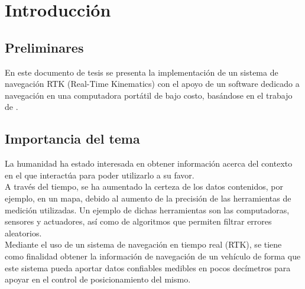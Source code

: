 
\chapter{Introducción} %

\label{Chap:Intro} %


\newcommand{\keyword}[1]{\textbf{#1}}
\newcommand{\tabhead}[1]{\textbf{#1}}
\newcommand{\code}[1]{\texttt{#1}}
\newcommand{\file}[1]{\texttt{\bfseries#1}}
\newcommand{\option}[1]{\texttt{\itshape#1}}


\section{Preliminares}
En este documento de tesis se presenta la implementación de un sistema de navegación RTK (Real-Time Kinematics\footnotemark) con el apoyo de un software dedicado a navegación en una computadora portátil de bajo costo, basándose en el trabajo de \cite{takasu2009development}.


\section{Importancia del tema}
La humanidad ha estado interesada en obtener información acerca del contexto en el que interactúa para poder utilizarlo a su favor. \\

A través del tiempo, se ha aumentado la certeza de los datos contenidos, por ejemplo, en un mapa, debido al aumento de la precisión de las herramientas de medición utilizadas. Un ejemplo de dichas herramientas son las computadoras, sensores y actuadores, así como de algoritmos que permiten filtrar errores aleatorios. \\

Mediante el uso de un sistema de navegación en tiempo real (RTK), se tiene como finalidad obtener la información de navegación de un vehículo de forma que este sistema pueda aportar datos confiables medibles en pocos decímetros para apoyar en el control de posicionamiento del mismo.

